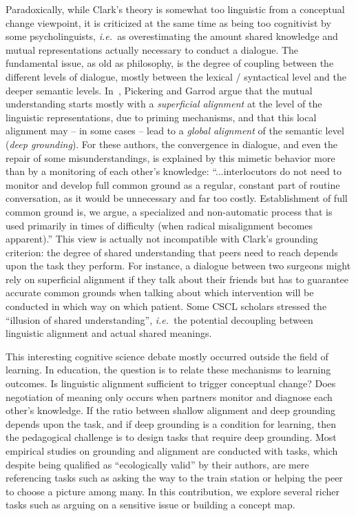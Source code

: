 \documentclass{sig-alternate}
\newcommand{\ie}{{\textit{i.e.~}}}
\begin{document}
Paradoxically, while Clark's theory is somewhat too linguistic from a conceptual
change viewpoint, it is criticized at the same time as being too cognitivist by
some psycholinguists, \ie as overestimating the amount shared knowledge and
mutual representations actually necessary to conduct a dialogue. The fundamental
issue, as old as philosophy, is the degree of coupling between the different
levels of dialogue, mostly between the lexical / syntactical level and the
deeper semantic levels. In~\cite{pickering2006alignment}, Pickering and Garrod
argue that the mutual understanding starts mostly with a \emph{superficial
alignment} at the level of the linguistic representations, due to priming
mechanisms, and that this local alignment may -- in some cases -- lead to a
\emph{global alignment} of the semantic level (\emph{deep grounding}).  For
these authors, the convergence in dialogue, and even the repair of some
misunderstandings, is explained by this mimetic behavior more than by a
monitoring of each other's knowledge: ``...interlocutors do not need to monitor
and develop full common ground as a regular, constant part of routine
conversation, as it would be unnecessary and far too costly. Establishment of
full common ground is, we argue, a specialized and non-automatic process that is
used primarily in times of difficulty (when radical misalignment becomes
apparent).'' This view is actually not incompatible with Clark's grounding
criterion: the degree of shared understanding that peers need to reach depends
upon the task they perform. For instance, a dialogue between two surgeons might
rely on superficial alignment if they talk about their friends but has to
guarantee accurate common grounds when talking about which intervention will be
conducted in which way on which patient.  Some CSCL scholars stressed the
``illusion of shared understanding'', \ie the potential decoupling between
linguistic alignment and actual shared meanings.

This interesting cognitive science debate mostly occurred outside the field of
learning. In education, the question is to relate these mechanisms to learning
outcomes. Is linguistic alignment sufficient to trigger conceptual change? Does
negotiation of meaning only occurs when partners monitor and diagnose each
other's knowledge. If the ratio between shallow alignment and deep grounding
depends upon the task, and if deep grounding is a condition for learning, then
the pedagogical challenge is to design tasks that require deep grounding. Most
empirical studies on grounding and alignment are conducted with tasks, which
despite being qualified as ``ecologically valid'' by their authors, are mere
referencing tasks such as asking the way to the train station or helping the
peer to choose a picture among many. In this contribution, we explore several
richer tasks such as arguing on a sensitive issue or building a concept map.  
\end{document}
